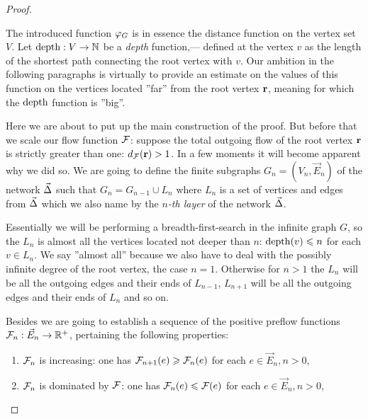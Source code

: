 \documentclass[12pt]{article}
\begin{document}
\begin{proof}
\begin{definition}
      \end{definition}
      \begin{remark}
        The introduced function $\varphi_{G}$ is in essence the distance function on the vertex set $V$.
        Let $\operatorname{depth}: V \to \mathbb{N}$ be a \emph{depth} function,--- defined at the vertex $v$ as the length of the shortest path connecting the root vertex with
          $v$.
        Our ambition in the following paragraphs is virtually to provide an estimate on the values of this function on the vertices
          located ''far'' from the root vertex $\mathbf{r}$, meaning for which the $\operatorname{depth}$ function is ''big''. 
      \end{remark}
      Here we are about to put up the main construction of the proof.
      But before that we scale our flow function $\mathcal{F}$: suppose the total outgoing flow of the root vertex $\mathbf{r}$ is strictly greater than one:
        $d_{\mathcal{F}}(\mathbf{r}) > 1$.
      In a few moments it will become apparent why we did so.
      We are going to define the finite subgraphs $G_n = (V_n, \vec{E}_n)$ of the network $\vec{\Delta}$ such that
        $G_{n} = G_{n-1} \cup L_n$ where $L_n$ is a set of vertices and edges from $\vec{\Delta}$ which we also name by
        the \emph{$n$-th layer} of the network $\vec{\Delta}$.
      \begin{note}
        Essentially we will be performing a breadth-first-search in the infinite graph $G$, so the $L_n$ is
          almost all the vertices located not deeper than $n$: $\operatorname{depth}(v) \leqslant n$ for each $v \in L_n$.
        We say ''almost all'' because we also have to deal with the possibly infinite degree of the root vertex, the case $n = 1$.
        Otherwise for $n > 1$ the $L_n$ will be all the outgoing edges and their ends of $L_{n-1}$, $L_{n+1}$ will be
          all the outgoing edges and their ends of $L_n$ and so on.
      \end{note}
      Besides we are going to establish a sequence of the positive preflow functions $\mathcal{F}_{n}: \vec{E}_n \to \mathbb{R}^{+}$,
        pertaining the following properties:
        \begin{enumerate}[label=\textbf{P\arabic*}]
          \item \label{p1} $\mathcal{F}_{n}$ is increasing: one has $\mathcal{F}_{n+1}(e) \geqslant \mathcal{F}_{n}(e)$ for each $e \in \vec{E}_n, n > 0$,
          \item \label{p2} $\mathcal{F}_{n}$ is dominated by $\mathcal{F}$: one has $\mathcal{F}_{n}(e) \leqslant \mathcal{F}(e)$ for each $e \in \vec{E}_n, n> 0$,

\end{enumerate}
\end{proof}
\end{document}
